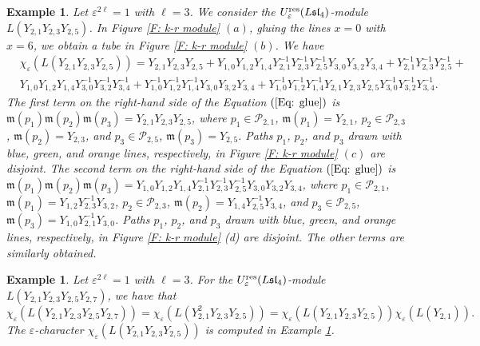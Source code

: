 \documentclass[12pt, reqno]{amsart}
\newtheorem{example}[theorem]{Example}
\numberwithin{equation}{section}
\newcommand{\res}{{\rm res}}
\begin{document}
{\begin{example}\label{Ex:2_12_32_5}
Let $\varepsilon^{2 \ell}=1$ with $\ell=3$. We consider the $U_{\varepsilon}^{\res}({L\mathfrak{sl}_{4}})$-module $L(Y_{2,1}Y_{2,3}Y_{2,5})$. In Figure \ref{F: k-r module} $(a)$, gluing the lines $x=0$ with $x=6$, we obtain a tube in Figure \ref{F: k-r module} $(b)$. We have
\begin{align}\label{Eq: glue}
&\chi_{\varepsilon}(L(Y_{2,1}Y_{2,3}Y_{2,5}))=Y_{2,1}Y_{2,3}Y_{2,5}+Y_{1,0}Y_{1,2}Y_{1,4}Y_{2,1}^{-1}Y_{2,3}^{-1}Y_{2,5}^{-1}Y_{3,0}Y_{3,2}Y_{3,4}+Y_{2,1}^{-1}Y_{2,3}^{-1}Y_{2,5}^{-1}+\nonumber\\
&Y_{1,0}Y_{1,2}Y_{1,4}Y_{3,0}^{-1}Y_{3,2}^{-1}Y_{3,4}^{-1}+Y_{1,0}^{-1}Y_{1,2}^{-1}Y_{1,4}^{-1}Y_{3,0}Y_{3,2}Y_{3,4}
+Y_{1,0}^{-1}Y_{1,2}^{-1}Y_{1,4}^{-1}Y_{2,1}Y_{2,3}Y_{2,5}Y_{3,0}^{-1}Y_{3,2}^{-1}Y_{3,4}^{-1}.
\end{align}
The first term on the right-hand side of the Equation $(\ref{Eq: glue})$ is $\mathfrak{m}(p_1)\mathfrak{m}(p_2)\mathfrak{m}(p_3)=Y_{2,1}Y_{2,3}Y_{2,5}$, where $p_1 \in \mathscr{P}_{2,1}$, $\mathfrak{m}(p_1)=Y_{2,1}$, $p_2 \in \mathscr{P}_{2,3}$, $\mathfrak{m}(p_2)=Y_{2,3}$, and $p_3 \in \mathscr{P}_{2,5}$, $\mathfrak{m}(p_3)=Y_{2,5}$. Paths $p_1$, $p_2$, and $p_3$ drawn with blue, green, and orange lines, respectively, in Figure \ref{F: k-r module} $(c)$ are disjoint. The second term on the right-hand side of the Equation $(\ref{Eq: glue})$ is $\mathfrak{m}(p_1)\mathfrak{m}(p_2)\mathfrak{m}(p_3)=Y_{1,0}Y_{1,2}Y_{1,4}Y_{2,1}^{-1}Y_{2,3}^{-1}Y_{2,5}^{-1}Y_{3,0}Y_{3,2}Y_{3,4}$, where $p_1 \in \mathscr{P}_{2,1}$, $\mathfrak{m}(p_1)=Y_{1,2}Y_{2,3}^{-1}Y_{3,2}$, $p_2\in \mathscr{P}_{2,3}$, $\mathfrak{m}(p_2)=Y_{1,4}Y_{2,5}^{-1}Y_{3,4}$, and $p_3\in \mathscr{P}_{2,5}$, $\mathfrak{m}(p_3)=Y_{1,0}Y_{2,1}^{-1}Y_{3,0}$. Paths $p_1$, $p_2$, and $p_3$ drawn with blue, green, and orange lines, respectively, in Figure \ref{F: k-r module} (d) are disjoint. The other terms are similarly obtained.
\end{example}


\begin{example}
Let $\varepsilon^{2 \ell}=1$ with $\ell=3$. For the $U_{\varepsilon}^{\res}({L\mathfrak{sl}_{4}})$-module $L(Y_{2,1}Y_{2,3}Y_{2,5}Y_{2,7})$, we have that
\[
\chi_{\varepsilon}(L(Y_{2,1}Y_{2,3}Y_{2,5}Y_{2,7}))=\chi_{\varepsilon}(L(Y_{2,1}^2Y_{2,3}Y_{2,5}))=\chi_{\varepsilon}(L(Y_{2,1}Y_{2,3}Y_{2,5}))\chi_{\varepsilon}(L(Y_{2,1})).
\]
The $\varepsilon$-character $\chi_{\varepsilon}(L(Y_{2,1}Y_{2,3}Y_{2,5}))$ is computed in Example \ref{Ex:2_12_32_5}.
\end{example}



}
\end{document}
